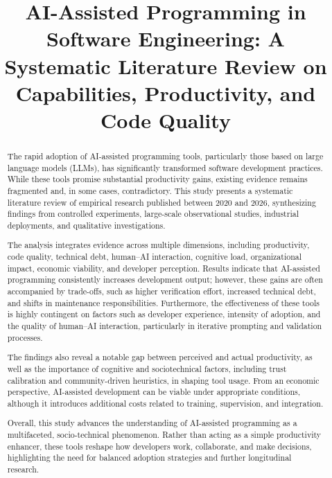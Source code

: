 \documentclass[conference]{IEEEtran}
\begin{document}
\title{AI-Assisted Programming in Software Engineering: A Systematic Literature Review on Capabilities, Productivity, and Code Quality}

\author{
}

\maketitle

\begin{abstract}
The rapid adoption of AI-assisted programming tools, particularly those based on large language models (LLMs), has significantly transformed software development practices. While these tools promise substantial productivity gains, existing evidence remains fragmented and, in some cases, contradictory. This study presents a systematic literature review of empirical research published between 2020 and 2026, synthesizing findings from controlled experiments, large-scale observational studies, industrial deployments, and qualitative investigations.

The analysis integrates evidence across multiple dimensions, including productivity, code quality, technical debt, human--AI interaction, cognitive load, organizational impact, economic viability, and developer perception. Results indicate that AI-assisted programming consistently increases development output; however, these gains are often accompanied by trade-offs, such as higher verification effort, increased technical debt, and shifts in maintenance responsibilities. Furthermore, the effectiveness of these tools is highly contingent on factors such as developer experience, intensity of adoption, and the quality of human--AI interaction, particularly in iterative prompting and validation processes.

The findings also reveal a notable gap between perceived and actual productivity, as well as the importance of cognitive and sociotechnical factors, including trust calibration and community-driven heuristics, in shaping tool usage. From an economic perspective, AI-assisted development can be viable under appropriate conditions, although it introduces additional costs related to training, supervision, and integration.

Overall, this study advances the understanding of AI-assisted programming as a multifaceted, socio-technical phenomenon. Rather than acting as a simple productivity enhancer, these tools reshape how developers work, collaborate, and make decisions, highlighting the need for balanced adoption strategies and further longitudinal research.
\end{abstract}
\end{document}
